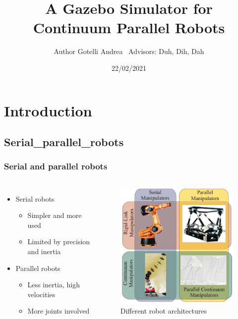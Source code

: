 \documentclass[compress]{thesisbeamer}
\title{A Gazebo Simulator for Continuum Parallel Robots}
\author[Gotelli Andrea]{Author Gotelli Andrea\newline ~ \newline \normalsize{Advisors: Duh, Dih, Dah}}
\date{22/02/2021}
\begin{document}
\MakeTitleNoFoot

    
   	\section{Introduction}
        \subsection{Serial_parallel_robots}
        \frametitle{Serial and parallel robots}
        \begin{frame}
            \begin{columns}
			\begin{itemize}%
  				\item Serial robots
  				\begin{itemize}%
   					\item Simpler and more used
   					\item Limited by precision and inertia
  				\end{itemize}\vfill
  				\item Parallel robots
  				\begin{itemize}%
   					\item Less inertia, high velocities
   					\item More joints involved
  				\end{itemize}\vfill
 			\end{itemize}
			\vspace{2cm}
			\begin{figure}[h]
				\centering
				\includegraphics[width=\textwidth]{images/serial_parall_robots}
				\caption{Different robot architectures}
			\end{figure}
			\end{columns}
		\end{frame}
\end{document}

